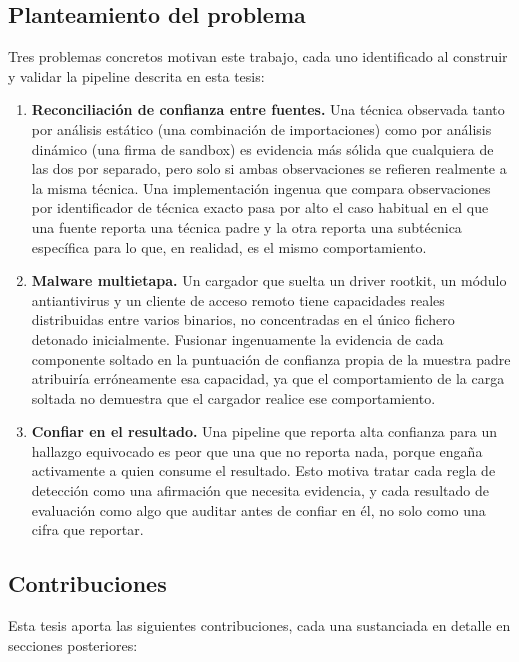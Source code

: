 \subsection{Planteamiento del problema}

Tres problemas concretos motivan este trabajo, cada uno identificado al
construir y validar la pipeline descrita en esta tesis:

\begin{enumerate}
  \item \textbf{Reconciliaci\'on de confianza entre fuentes.} Una
    t\'ecnica observada tanto por an\'alisis est\'atico (una
    combinaci\'on de importaciones) como por an\'alisis din\'amico (una
    firma de sandbox) es evidencia m\'as s\'olida que cualquiera de las
    dos por separado, pero solo si ambas observaciones se refieren
    realmente a la misma t\'ecnica. Una implementaci\'on ingenua que
    compara observaciones por identificador de t\'ecnica exacto pasa
    por alto el caso habitual en el que una fuente reporta una t\'ecnica
    padre y la otra reporta una subt\'ecnica espec\'ifica para lo que,
    en realidad, es el mismo comportamiento.
  \item \textbf{Malware multietapa.} Un cargador que suelta un driver
    rootkit, un m\'odulo antiantivirus y un cliente de acceso remoto
    tiene capacidades reales distribuidas entre varios binarios, no
    concentradas en el \'unico fichero detonado inicialmente. Fusionar
    ingenuamente la evidencia de cada componente soltado en la
    puntuaci\'on de confianza propia de la muestra padre atribuir\'ia
    err\'oneamente esa capacidad, ya que el comportamiento de la carga
    soltada no demuestra que el cargador realice ese comportamiento.
  \item \textbf{Confiar en el resultado.} Una pipeline que reporta alta
    confianza para un hallazgo equivocado es peor que una que no
    reporta nada, porque enga\~na activamente a quien consume el
    resultado. Esto motiva tratar cada regla de detecci\'on como una
    afirmaci\'on que necesita evidencia, y cada resultado de
    evaluaci\'on como algo que auditar antes de confiar en \'el, no
    solo como una cifra que reportar.
\end{enumerate}

\subsection{Contribuciones}

Esta tesis aporta las siguientes contribuciones, cada una sustanciada
en detalle en secciones posteriores:

